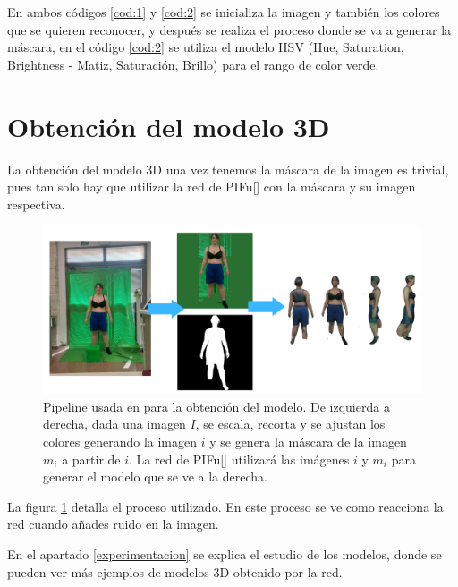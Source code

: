 En ambos códigos \ref{cod:1} y \ref{cod:2} se inicializa la imagen y también los colores que se quieren reconocer, y después se realiza el proceso donde se va a generar la máscara, en el código \ref{cod:2} se utiliza el modelo HSV (Hue, Saturation, Brightness - Matiz, Saturación, Brillo) para el rango de color verde.

\section{Obtención del modelo 3D}

La obtención del modelo 3D una vez tenemos la máscara de la imagen es trivial, pues tan solo hay que utilizar la red de PIFu[\cite{pifu}] con la máscara y su imagen respectiva.

\begin{figure}[H]
	\centering
	\includegraphics[scale=0.6]{imagenes/proceso1.png}
	\caption{Pipeline usada en para la obtención del modelo. De izquierda a derecha, dada una imagen $I$, se escala, recorta y se ajustan los colores generando la imagen $i$ y se genera la máscara de la imagen $m_i$ a partir de $i$. La red de PIFu[\cite{pifu}] utilizará las imágenes $i$ y $m_i$ para generar el modelo que se ve a la derecha.}
	\label{fig:proceso}
\end{figure}

La figura \ref{fig:proceso} detalla el proceso utilizado. En este proceso se ve como reacciona la red cuando añades ruido en la imagen.

En el apartado \ref{experimentacion} se explica el estudio de los modelos, donde se pueden ver más ejemplos de modelos 3D obtenido por la red.



